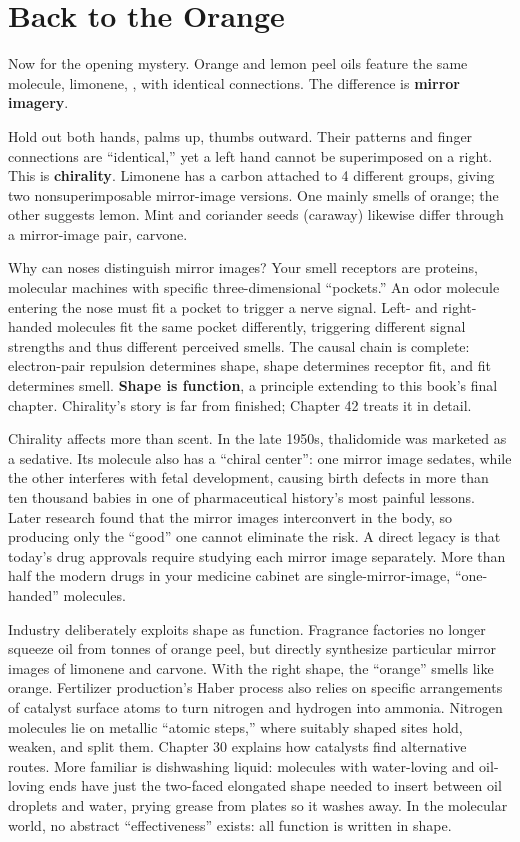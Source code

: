 \section{Back to the Orange}

Now for the opening mystery. Orange and lemon peel oils feature the same molecule, limonene, , with identical connections. The difference is \textbf{mirror imagery}.

Hold out both hands, palms up, thumbs outward. Their patterns and finger connections are ``identical,'' yet a left hand cannot be superimposed on a right. This is \textbf{chirality}. Limonene has a carbon attached to 4 different groups, giving two nonsuperimposable mirror-image versions. One mainly smells of orange; the other suggests lemon. Mint and coriander seeds (caraway) likewise differ through a mirror-image pair, carvone.

Why can noses distinguish mirror images? Your smell receptors are proteins, molecular machines with specific three-dimensional ``pockets.'' An odor molecule entering the nose must fit a pocket to trigger a nerve signal. Left- and right-handed molecules fit the same pocket differently, triggering different signal strengths and thus different perceived smells. The causal chain is complete: electron-pair repulsion determines shape, shape determines receptor fit, and fit determines smell. \textbf{Shape is function}, a principle extending to this book's final chapter. Chirality's story is far from finished; Chapter 42 treats it in detail.

Chirality affects more than scent. In the late 1950s, thalidomide was marketed as a sedative. Its molecule also has a ``chiral center'': one mirror image sedates, while the other interferes with fetal development, causing birth defects in more than ten thousand babies in one of pharmaceutical history's most painful lessons. Later research found that the mirror images interconvert in the body, so producing only the ``good'' one cannot eliminate the risk. A direct legacy is that today's drug approvals require studying each mirror image separately. More than half the modern drugs in your medicine cabinet are single-mirror-image, ``one-handed'' molecules.

Industry deliberately exploits shape as function. Fragrance factories no longer squeeze oil from tonnes of orange peel, but directly synthesize particular mirror images of limonene and carvone. With the right shape, the ``orange'' smells like orange. Fertilizer production's Haber process also relies on specific arrangements of catalyst surface atoms to turn nitrogen and hydrogen into ammonia. Nitrogen molecules lie on metallic ``atomic steps,'' where suitably shaped sites hold, weaken, and split them. Chapter 30 explains how catalysts find alternative routes. More familiar is dishwashing liquid: molecules with water-loving and oil-loving ends have just the two-faced elongated shape needed to insert between oil droplets and water, prying grease from plates so it washes away. In the molecular world, no abstract ``effectiveness'' exists: all function is written in shape.

